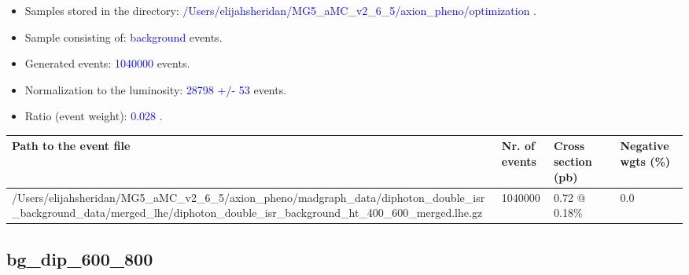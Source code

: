 \documentclass[a4paper, 10pt]{article}
\begin{document}
\begin{itemize}
  \item Samples stored in the directory: \textcolor{blue}{/\-Users/\-elijahsheridan/\-MG5\_aMC\_v2\_6\_5/\-axion\_pheno/\-optimization} .
   \item Sample consisting of: \textcolor{blue}{background}  events.
   \item Generated events: \textcolor{blue}{1040000 }  events.
   \item Normalization to the luminosity: \textcolor{blue}{28798}\textcolor{blue}{ +/\-- }\textcolor{blue}{53 }  events.
   \item Ratio (event weight): \textcolor{blue}{0.028 } .  
 
\end{itemize}
\begin{table}[H]
  \begin{center}
    \begin{tabular}{|m{55.0mm}|m{25.0mm}|m{30.0mm}|m{30.0mm}|}
      \hline
      {\cellcolor{yellow}         Path to the event file}& {\cellcolor{yellow}         Nr. of events}& {\cellcolor{yellow}         Cross section (pb)}& {\cellcolor{yellow}         Negative wgts (\%)}\\
      \hline
      {\cellcolor{white}          /\-Users/\-elijahsheridan/\-MG5\_aMC\_v2\_6\_5/\-axion\_pheno/\-madgraph\_data/\-diphoton\_double\_isr\_background\_data/\-merged\_lhe/\-diphoton\_double\_isr\_background\_ht\_400\_600\_merged.lhe.gz}& {\cellcolor{white}          1040000}& {\cellcolor{white}          0.72 @ 0.18\%}& {\cellcolor{white}          0.0}\\
\hline
    \end{tabular}
  \end{center}
\end{table}

\subsection{ bg\_dip\_600\_800}
\end{document}
